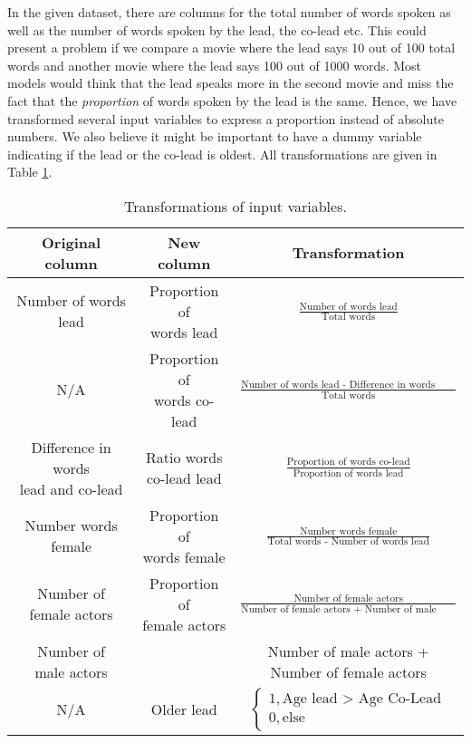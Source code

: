 \documentclass[../../project.tex]{subfiles}
\begin{document}
	In the given dataset, there are columns for the total number of words spoken as well as the number of words spoken by the lead, the co-lead etc. This could present a problem if we compare a movie where the lead says 10 out of 100 total words and another movie where the lead says 100 out of 1000 words. Most models would think that the lead speaks more in the second movie and miss the fact that the \textit{proportion} of words spoken by the lead is the same. Hence, we have transformed several input variables to express a proportion instead of absolute numbers. We also believe it might be important to have a dummy variable indicating if the lead or the co-lead is oldest. All transformations are given in Table \ref{tab:transformations}.
	
	\begin{table}[h!]
		\centering
		\caption{Transformations of input variables.}
		\begin{tabular}{ccc}
		\toprule
			Original column & New column & Transformation \\
			\midrule
			Number of words lead & \makecell{Proportion of \\ words lead} & $\frac{\text{Number of words lead}}{\text{Total words}}$ \\
			N/A & \makecell{Proportion of \\ words co-lead} & $\frac{\text{Number of words lead - Difference in words lead and co-lead}}{\text{Total words}}$ \\
			\makecell{Difference in words \\ lead and co-lead} & \makecell{Ratio words \\ co-lead lead} & $\frac{\text{Proportion of words co-lead}}{\text{Proportion of words lead}}$ \\
			Number words female & \makecell{Proportion of \\ words female} & $\frac{\text{Number words female}}{\text{Total words - Number of words lead}}$ \\
			\makecell{Number of \\ female actors} & \makecell{Proportion of \\ female actors} & $\frac{\text{Number of female actors}}{\text{Number of female actors + Number of male actos}}$ \\
			\makecell{Number of \\ male actors} & \makecell{Number of actors} & \makecell{Number of male actors + \\ Number of female actors} \\
			N/A & Older lead & $\begin{cases} 1, \text{Age lead > Age Co-Lead} \\ 0, \text{else} \end{cases}$ \\
			\bottomrule
		\end{tabular}
		
		\label{tab:transformations}
	\end{table}
	
\end{document}
